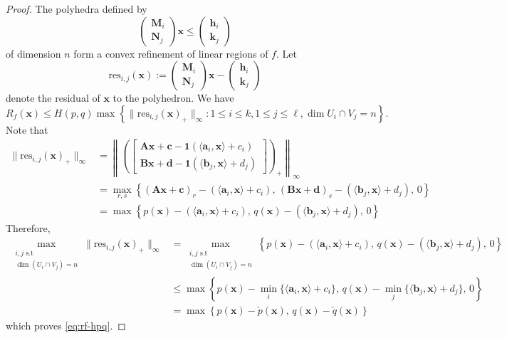 \documentclass[10pt]{article}
\theoremstyle{definition}
\theoremstyle{remark}
\renewcommand{\vec}[1]{\mathbf{#1}}
\def\va{{\vec{a}}}
\def\vb{{\vec{b}}}
\def\vc{{\bm{c}}}
\def\vd{{\bm{d}}}
\def\vh{{\vec{h}}}
\def\vk{{\bm{k}}}
\def\vx{{\vec{x}}}
\def\mA{{\bm{A}}}
\def\mB{{\bm{B}}}
\def\mM{{\bm{M}}}
\def\mN{{\bm{N}}}
\begin{document}
\begin{proof}
The polyhedra defined by 
$$
\begin{pmatrix}
            \mM_i \\
            \mN_j
        \end{pmatrix} \vx \le \begin{pmatrix}
            \vh_i \\
            \vk_j
        \end{pmatrix}
$$
of dimension $n$ form a convex refinement of linear regions of $f$. Let 
$$\mathrm{res}_{i,j}(\vx):=\begin{pmatrix}
            \mM_i \\
            \mN_j
        \end{pmatrix} \vx- \begin{pmatrix}
            \vh_i \\
            \vk_j
        \end{pmatrix}
$$        
denote the residual of $\vx$ to the polyhedron. We have 
$$
R_f(\vx)\le H(p,q)\max\left\{\|\mathrm{res}_{i,j}(\vx)_+\|_\infty: 1 \le i \le k, 1 \le j \le \ell, \dim U_i \cap V_j = n \right\}.
$$
Note that
\begin{align*}
    \|\mathrm{res}_{i,j}(\vx)_+\|_\infty
        &= \left\|\left(
            \begin{bmatrix}\mA \vx+\vc-\mathbf{1}(\langle \va_i, \vx \rangle+c_i)\\
                            \mB \vx+\vd-\mathbf{1}(\langle \vb_j, \vx \rangle+d_j)\end{bmatrix}\right)_+\right\|_\infty\\
        &=\max_{r,s}\left\{(\mA \vx+\vc)_r-(\langle \va_i, \vx \rangle+c_i),\,(\mB \vx+\vd)_s-(\langle \vb_j, \vx \rangle+d_j),\, 0\right\}\\
        &=\max\left\{p(\vx)-(\langle \va_i, \vx\rangle+c_i),\, q(\vx)-(\langle \vb_j, \vx\rangle + d_j),\, 0\right\}
\end{align*}
Therefore,
\begin{align*}
    \max_{\substack{i, j \text{ s.t} \\ \dim (U_i \cap V_j) = n}}\|\mathrm{res}_{i,j}(\vx)_+\|_\infty
        &=\max_{\substack{i, j \text{ s.t} \\ \dim (U_i \cap V_j) = n}}\left\{p(\vx)-(\langle \va_i, \vx\rangle +c_i),\, q(\vx)-(\langle \vb_j,  \vx \rangle+d_j),\, 0\right\}\\
        &\le\max\left\{p(\vx)-\min_i\{\langle \va_i, \vx \rangle +c_i\},\, q(\vx)-\min_j\{\langle \vb_j, \vx \rangle +d_j\},\, 0\right\}\\
        &=\max\left\{p(\vx)-\check{p}(\vx),\,q(\vx)-\check{q}(\vx)\right\}
\end{align*}
which proves \eqref{eq:rf-hpq}.
\end{proof}
\end{document}
